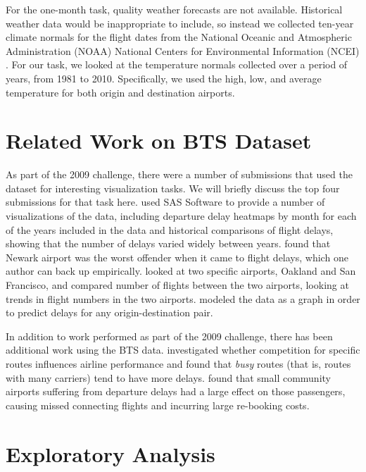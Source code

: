 \documentclass[twocolumn]{article}
\begin{document}
For the one-month task, quality weather forecasts are not available. Historical weather data would be inappropriate to include, so instead we collected ten-year climate normals for the flight dates from the National Oceanic and Atmospheric Administration (NOAA) National Centers for Environmental Information (NCEI) \citep{noaaclimatedata}.  For our task, we looked at the temperature normals collected over a period of years, from 1981 to 2010. Specifically, we used the high, low, and average temperature for both origin and destination airports.

\section{Related Work on BTS Dataset}

As part of the 2009 challenge, there were a number of submissions that used the dataset for interesting visualization tasks. We will briefly discuss the top four submissions for that task here.
\cite{wicklin2009congestion} used SAS Software to provide a number of visualizations of the data, including departure delay heatmaps by month for each of the years included in the data and historical comparisons of flight delays, showing that the number of delays varied widely between years.
\cite{hofmann2011delayed} found that Newark airport was the worst offender when it came to flight delays, which one author can back up empirically.
\cite{wickham2011tale} looked at two specific airports, Oakland and San Francisco, and compared number of flights between the two airports, looking at trends in flight numbers in the two airports.
\cite{dey2009minimizing} modeled the data as a graph in order to predict delays for any origin-destination pair.

In addition to work performed as part of the 2009 challenge, there has been additional work using the BTS data.
\cite{rupp2006does} investigated whether competition for specific routes influences airline performance and found that \emph{busy} routes (that is, routes with many carriers) tend to have more delays.
\cite{stone2015investigating} found that small community airports suffering from departure delays had a large effect on those passengers, causing missed connecting flights and incurring large re-booking costs.


\section{Exploratory Analysis}
\label{sec:exploratory}
\end{document}

